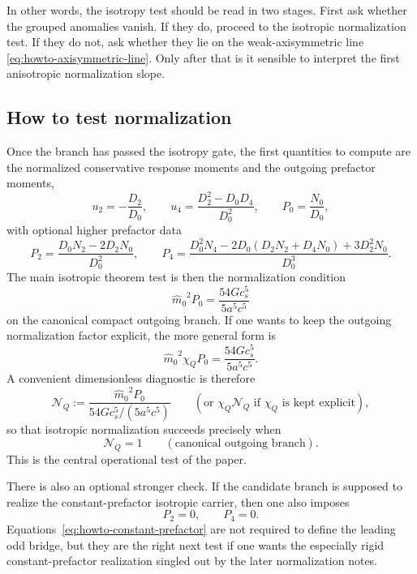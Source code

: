 \documentclass[11pt]{article}
\theoremstyle{definition}
\newcommand{\mhat}{\ensuremath{\hat m_0}}
\begin{document}
In other words, the isotropy test should be read in two stages. First ask whether the grouped anomalies vanish. If they do, proceed to the isotropic normalization test. If they do not, ask whether they lie on the weak-axisymmetric line \eqref{eq:howto-axisymmetric-line}. Only after that is it sensible to interpret the first anisotropic normalization slope.

\subsection{How to test normalization}

Once the branch has passed the isotropy gate, the first quantities to compute are the normalized conservative response moments and the outgoing prefactor moments,
\begin{equation}
 u_2=-\frac{D_2}{D_0},
 \qquad
 u_4=\frac{D_2^2-D_0D_4}{D_0^2},
 \qquad
 P_0=\frac{N_0}{D_0},
 \label{eq:howto-u2u4P0}
\end{equation}
with optional higher prefactor data
\begin{equation}
 P_2=\frac{D_0N_2-2D_2N_0}{D_0^2},
 \qquad
 P_4=\frac{D_0^2N_4-2D_0(D_2N_2+D_4N_0)+3D_2^2N_0}{D_0^3}.
 \label{eq:howto-P2P4}
\end{equation}
The main isotropic theorem test is then the normalization condition
\begin{equation}
 \boxed{\mhat^{2}P_0=\frac{54Gc_s^5}{5a^5c^5}}
 \label{eq:howto-main-normalization}
\end{equation}
on the canonical compact outgoing branch. If one wants to keep the outgoing normalization factor explicit, the more general form is
\begin{equation}
 \boxed{\mhat^{2}\chi_Q P_0=\frac{54Gc_s^5}{5a^5c^5}.}
 \label{eq:howto-main-normalization-chi}
\end{equation}
A convenient dimensionless diagnostic is therefore
\begin{equation}
 \mathcal N_Q:=
 \frac{\mhat^{2}P_0}{54Gc_s^5/(5a^5c^5)}
 \qquad
 (\text{or }\chi_Q\mathcal N_Q\text{ if }\chi_Q\text{ is kept explicit}),
 \label{eq:howto-NQ-diagnostic}
\end{equation}
so that isotropic normalization succeeds precisely when
\begin{equation}
 \mathcal N_Q=1
 \qquad
 (\text{canonical outgoing branch}).
 \label{eq:howto-NQ-success}
\end{equation}
This is the central operational test of the paper.

There is also an optional stronger check. If the candidate branch is supposed to realize the constant-prefactor isotropic carrier, then one also imposes
\begin{equation}
 P_2=0,
 \qquad
 P_4=0.
 \label{eq:howto-constant-prefactor}
\end{equation}
Equations~\eqref{eq:howto-constant-prefactor} are not required to define the leading odd bridge, but they are the right next test if one wants the especially rigid constant-prefactor realization singled out by the later normalization notes.
\end{document}
